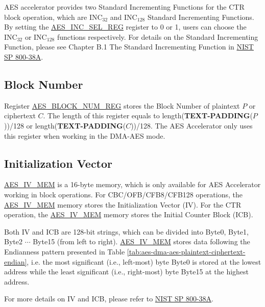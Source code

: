 \documentclass[main\_\_EN.tex]{subfiles}
\begin{document}
AES accelerator provides two Standard Incrementing Functions for the CTR block operation, which are INC$_{32}$ and INC$_{128}$ Standard Incrementing Functions. By setting the  \hyperref[regdesc:AESINCSELREG]{AES\_INC\_SEL\_REG} register to 0 or 1, users can choose the INC$_{32}$ or INC$_{128}$ functions respectively. For details on the Standard Incrementing Function, please see Chapter B.1 The Standard Incrementing Function in \href{https://nvlpubs.nist.gov/nistpubs/Legacy/SP/nistspecialpublication800-38a.pdf}{NIST SP 800-38A}.

\subsection{Block Number}\label{sec:aes-block-number}

Register \hyperref[regdesc:AESBLOCKNUMREG]{AES\_BLOCK\_NUM\_REG} stores the Block Number of plaintext $P$ or ciphertext $C$. The length of this register equals to length({\bfseries TEXT-PADDING}($P$))/128 or length({\bfseries TEXT-PADDING}($C$))/128. The AES Accelerator only uses this register when working in the DMA-AES mode.

\subsection{Initialization Vector}\label{sec:aes-init-vector}

\label{memdesc:AESIVMEM}\hyperref[memdesc:AESIVMEM]{AES\_IV\_MEM} is a 16-byte memory, which is only available for AES Accelerator working in block operations. For CBC/OFB/CFB8/CFB128 operations, the \hyperref[memdesc:AESIVMEM]{AES\_IV\_MEM} memory stores the Initialization Vector (IV). For the CTR operation, the \hyperref[memdesc:AESIVMEM]{AES\_IV\_MEM} memory stores the Initial Counter Block (ICB). 

Both IV and ICB are 128-bit strings, which can be divided into Byte0, Byte1, Byte2 \begin{math}\cdots\end{math} Byte15 (from left to right). \hyperref[memdesc:AESIVMEM]{AES\_IV\_MEM} stores data following the Endianness pattern presented in Table \ref{tab:aes-dma-aes-plaintext-ciphertext-endian}, i.e. the most significant (i.e., left-most) byte Byte0 is stored at the lowest address while the least significant (i.e., right-most) byte Byte15 at the highest address. 

For more details on IV and ICB, please refer to \href{https://nvlpubs.nist.gov/nistpubs/Legacy/SP/nistspecialpublication800-38a.pdf}{NIST SP 800-38A}.
\end{document}

